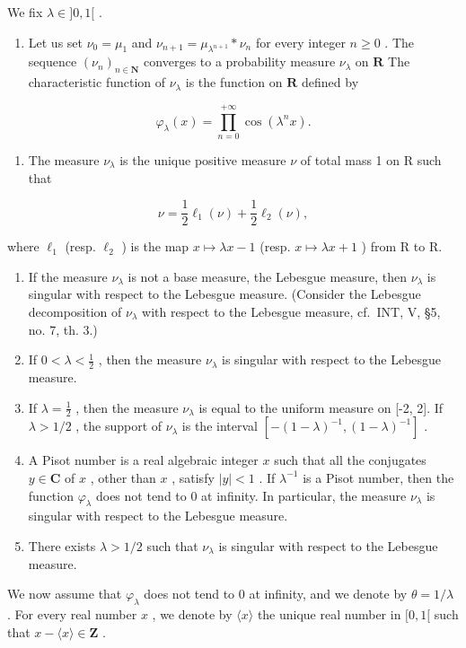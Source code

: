We fix \(\lambda \in ]0,1[\) .

\begin{enumerate}
\def\labelenumi{\alph{enumi})}
\tightlist
\item
  Let us set \(\nu_0 = \mu_1\) and \(\nu_{n+1} = \mu_{\lambda^{n+1}} * \nu_n\) for every integer \(n \geqslant 0\) . The sequence \((\nu_n)_{n \in \mathbf{N}}\) converges to a probability measure \(\nu_\lambda\) on \(\mathbf{R}\) The characteristic function of \(\nu_\lambda\) is the function on \(\mathbf{R}\) defined by
\end{enumerate}

\[
\varphi_ {\lambda} (x) = \prod_ {n = 0} ^ {+ \infty} \cos (\lambda^ {n} x).
\]

\begin{enumerate}
\def\labelenumi{\alph{enumi})}
\setcounter{enumi}{1}
\tightlist
\item
  The measure \(\nu_{\lambda}\) is the unique positive measure \(\nu\) of total mass 1 on R such that
\end{enumerate}

\[
\nu = \frac {1}{2} \ell_ {1} (\nu) + \frac {1}{2} \ell_ {2} (\nu),
\]

where \(\ell_{1}\) (resp. \(\ell_{2}\) ) is the map \(x \mapsto \lambda x - 1\) (resp. \(x \mapsto \lambda x + 1\) ) from R to R.

\begin{enumerate}
\def\labelenumi{\alph{enumi})}
\setcounter{enumi}{2}
\item
  If the measure \(\nu_{\lambda}\) is not a base measure, the Lebesgue measure, then \(\nu_{\lambda}\) is singular with respect to the Lebesgue measure. (Consider the Lebesgue decomposition of \(\nu_{\lambda}\) with respect to the Lebesgue measure, cf.~INT, V, §5, no. 7, th. 3.)
\item
  If \(0 < \lambda < \frac{1}{2}\) , then the measure \(\nu_{\lambda}\) is singular with respect to the Lebesgue measure.
\item
  If \(\lambda = \frac{1}{2}\) , then the measure \(\nu_{\lambda}\) is equal to the uniform measure on {[}-2, 2{]}. If \(\lambda > 1/2\) , the support of \(\nu_{\lambda}\) is the interval \([-(1-\lambda)^{-1}, (1-\lambda)^{-1}]\) .
\item
  A Pisot number is a real algebraic integer \(x\) such that all the conjugates \(y \in \mathbf{C}\) of \(x\) , other than \(x\) , satisfy \(|y| < 1\) . If \(\lambda^{-1}\) is a Pisot number, then the function \(\varphi_{\lambda}\) does not tend to 0 at infinity. In particular, the measure \(\nu_{\lambda}\) is singular with respect to the Lebesgue measure.
\item
  There exists \(\lambda > 1/2\) such that \(\nu_{\lambda}\) is singular with respect to the Lebesgue measure.
\end{enumerate}
\relax{}
We now assume that \(\varphi_{\lambda}\) does not tend to 0 at infinity, and we denote by \(\theta = 1 / \lambda\) . For every real number \(x\) , we denote by \(\langle x\rangle\) the unique real number in \([0,1[\) such that \(x - \langle x\rangle \in \mathbf{Z}\) .

